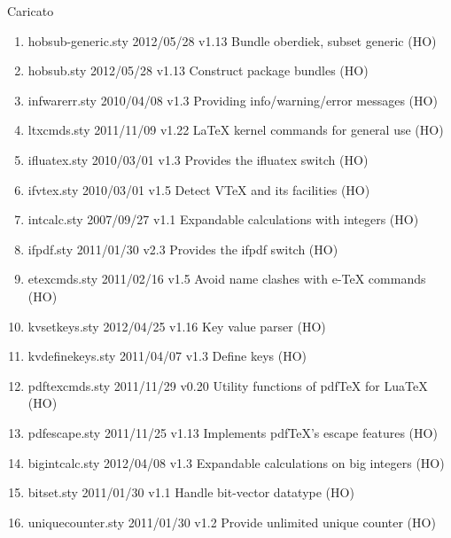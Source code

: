 Caricato 
\begin{enumerate}
\item hobsub-generic.sty    2012/05/28 v1.13 Bundle oberdiek, subset generic (HO)
\item hobsub.sty    2012/05/28 v1.13 Construct package bundles (HO)
\item infwarerr.sty        2010/04/08 v1.3 Providing info/warning/error messages (HO)
\item ltxcmds.sty    2011/11/09 v1.22 LaTeX kernel commands for general use (HO)
\item ifluatex.sty    2010/03/01 v1.3 Provides the ifluatex switch (HO)
\item ifvtex.sty      2010/03/01 v1.5 Detect VTeX and its facilities (HO)
\item intcalc.sty    2007/09/27 v1.1 Expandable calculations with integers (HO)
\item ifpdf.sty    2011/01/30 v2.3 Provides the ifpdf switch (HO)
\item etexcmds.sty     2011/02/16 v1.5 Avoid name clashes with e-TeX commands (HO)
\item kvsetkeys.sty     2012/04/25 v1.16 Key value parser (HO)
\item kvdefinekeys.sty   2011/04/07 v1.3 Define keys (HO)
\item pdftexcmds.sty    2011/11/29 v0.20 Utility functions of pdfTeX for LuaTeX (HO)
\item pdfescape.sty    2011/11/25 v1.13 Implements pdfTeX's escape features (HO)
\item bigintcalc.sty    2012/04/08 v1.3 Expandable calculations on big integers (HO)
\item bitset.sty    2011/01/30 v1.1 Handle bit-vector datatype (HO)
\item uniquecounter.sty   2011/01/30 v1.2 Provide unlimited unique counter (HO)
\end{enumerate} 
